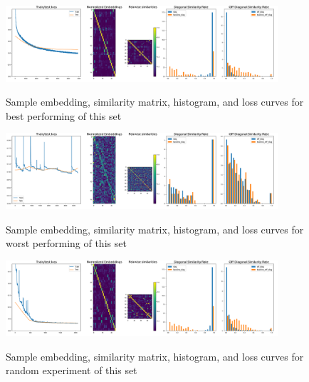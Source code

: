 \documentclass[a4paper]{article}
\begin{document}
\begin{figure}[H]
  \includegraphics[width=0.9\textwidth]{figures/pairwise5-skip0-relu-ld-false-unsup-true-0}
  \label{fig:pairwise5-skip0-relu-ld-false-unsup-true-0-sub1}
  \caption{Sample embedding, similarity matrix, histogram, and loss curves for best performing of this set}
\end{figure}
\begin{figure}[H]
  \includegraphics[width=0.9\textwidth]{figures/pairwise3-attn2-relu-ld-true-unsup-false-0}
  \label{fig:pairwise3-attn2-relu-ld-true-unsup-false-0-sub1}
  \caption{Sample embedding, similarity matrix, histogram, and loss curves for worst performing of this set}
\end{figure}
\begin{figure}[H]
  \includegraphics[width=0.9\textwidth]{figures/pairwise3-longskip0-relu-ld-true-unsup-false-0}
  \label{fig:pairwise3-longskip0-relu-ld-true-unsup-false-0-sub1}
  \caption{Sample embedding, similarity matrix, histogram, and loss curves for random experiment of this set}
\end{figure}
\end{document}
